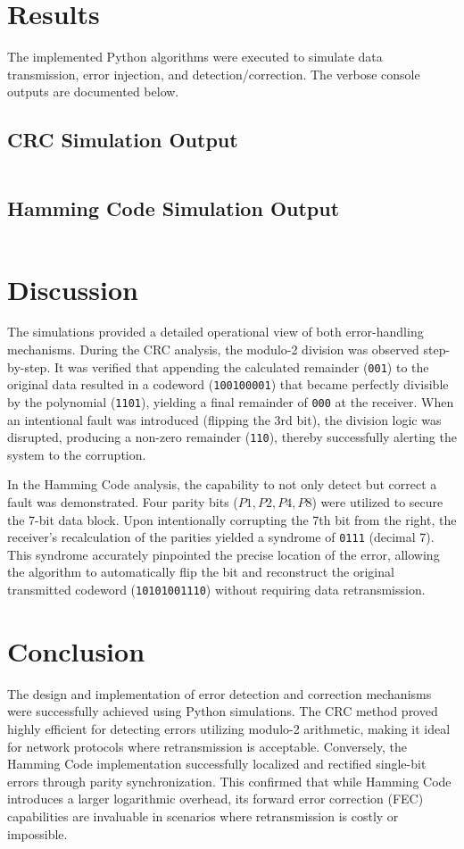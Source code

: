 \documentclass[11pt]{article}
\begin{document}
\section{Results}
The implemented Python algorithms were executed to simulate data transmission, error injection, and detection/correction. The verbose console outputs are documented below.

\subsection{CRC Simulation Output}
\inputminted{console}{./assets/images/output/crc_output.txt}

\subsection{Hamming Code Simulation Output}
\inputminted{console}{./assets/images/output/hamming_output.txt}

\section{Discussion}
The simulations provided a detailed operational view of both error-handling mechanisms. During the CRC analysis, the modulo-2 division was observed step-by-step. It was verified that appending the calculated remainder (\texttt{001}) to the original data resulted in a codeword (\texttt{100100001}) that became perfectly divisible by the polynomial (\texttt{1101}), yielding a final remainder of \texttt{000} at the receiver. When an intentional fault was introduced (flipping the 3rd bit), the division logic was disrupted, producing a non-zero remainder (\texttt{110}), thereby successfully alerting the system to the corruption.

In the Hamming Code analysis, the capability to not only detect but correct a fault was demonstrated. Four parity bits ($P1, P2, P4, P8$) were utilized to secure the 7-bit data block. Upon intentionally corrupting the 7th bit from the right, the receiver's recalculation of the parities yielded a syndrome of \texttt{0111} (decimal 7). This syndrome accurately pinpointed the precise location of the error, allowing the algorithm to automatically flip the bit and reconstruct the original transmitted codeword (\texttt{10101001110}) without requiring data retransmission.

\section{Conclusion}
The design and implementation of error detection and correction mechanisms were successfully achieved using Python simulations. The CRC method proved highly efficient for detecting errors utilizing modulo-2 arithmetic, making it ideal for network protocols where retransmission is acceptable. Conversely, the Hamming Code implementation successfully localized and rectified single-bit errors through parity synchronization. This confirmed that while Hamming Code introduces a larger logarithmic overhead, its forward error correction (FEC) capabilities are invaluable in scenarios where retransmission is costly or impossible.


\renewcommand{\bibname}{References}

\end{document}
